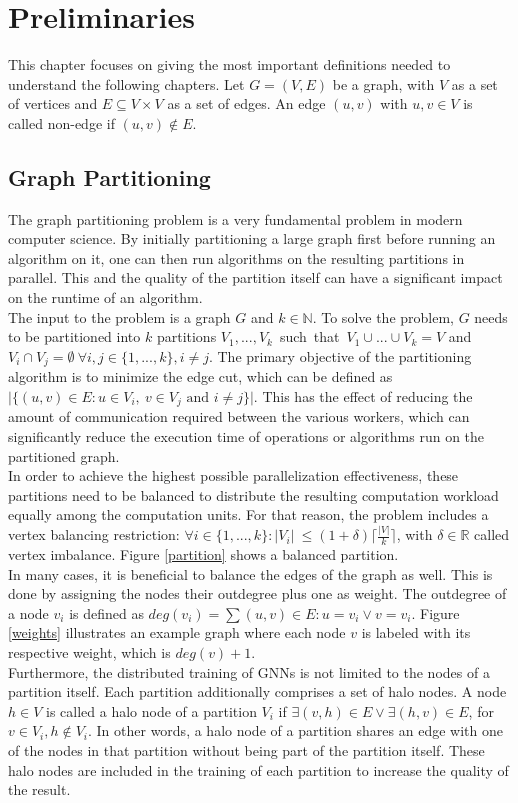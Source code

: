 \documentclass[acmsmall,nonacm,screen,review]{acmart}
\begin{document}
\section{Preliminaries}
This chapter focuses on giving the most important definitions needed to understand the following chapters. Let $G=(V,E)$ be a graph, with $V$ as a set of vertices and $E \subseteq V \times V$ as a set of edges. An edge $(u,v)$ with $u,v \in V$ is called non-edge if $(u,v) \notin E$.
\subsection{Graph Partitioning}
The graph partitioning problem is a very fundamental problem in modern computer science. By initially partitioning a large graph first before running an algorithm on it, one can then run algorithms on the resulting partitions in parallel. This and the quality of the partition itself can have a significant impact on the runtime of an algorithm. \\ 
The input to the problem is a graph $G$ and $k\in \mathbb{N}$. To solve the problem, $G$ needs to be partitioned into $k$ partitions \hbox{$V_{1},...,V_{k}$ such that $V_{1}\cup...\cup V_{k} = V$} and $V_{i}\cap V_{j} = \emptyset\ \forall i,j\in \{1,...,k\}, i \neq j$. The primary objective of the partitioning algorithm is to minimize the edge cut, which can be defined as $\vert \{(u,v)\in E : u\in V_{i},\ v\in V_{j} \text{ and } i\neq j \}\vert$. This has the effect of reducing the amount of communication required between the various workers, which can significantly reduce the execution time of operations or algorithms run on the partitioned graph.  \\
In order to achieve the highest possible parallelization effectiveness, these partitions need to be balanced to distribute the resulting computation workload equally among the computation units. For that reason, the problem includes a vertex balancing restriction: $\forall i\in \{1,...,k\} : \vert V_{i}\vert \ \leq (1 + \delta) \lceil \frac{\vert V \vert }{k} \rceil $, with $\delta \in \mathbb{R}$ called vertex imbalance. Figure \ref{partition} shows a balanced partition. \\
In many cases, it is beneficial to balance the edges of the graph as well. This is done by assigning the nodes their outdegree plus one as weight. The outdegree of a node $v_{i}$ is defined as $deg(v_{i}) = \sum{(u,v)\in E : u = v_{i} \vee v = v_{i}}$. Figure \ref{weights} illustrates an example graph where each node $v$ is labeled with its respective weight, which is $deg(v) + 1$. \\
Furthermore, the distributed training of GNNs is not limited to the nodes of a partition itself. Each partition additionally comprises a set of halo nodes. A node $h \in V$ is called a halo node of a partition $V_{i}$ if $\exists (v,h) \in E \vee \exists (h,v) \in E$, for $v \in V_{i}, h \notin V_{i}$. In other words, a halo node of a partition shares an edge with one of the nodes in that partition without being part of the partition itself. These halo nodes are included in the training of each partition to increase the quality of the result. 
\end{document}
